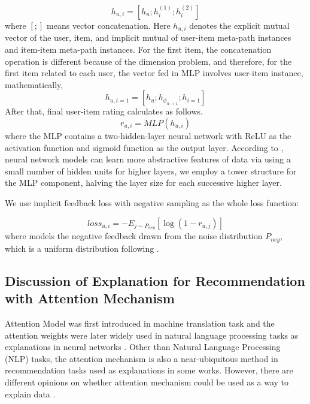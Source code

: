 \begin{equation}
	\label{eq3.5.1}
	h_{u,i}=[h_u;h_i^{(1)};h_i^{(2)}]
\end{equation}
where $[;]$ means vector concatenation. Here $h_{u,i}$ denotes the explicit mutual vector of the user, item, and implicit mutual of user-item meta-path instances and item-item meta-path instances. For the first item, the concatenation operation is different because of the dimension problem, and therefore, for the first item related to each user, the vector fed in MLP involves user-item instance, mathematically,
\begin{equation}
	h_{u,i=1} = [h_u;h_{\phi _{u\rightarrow 1}};h_{i=1}]
\end{equation}
After that, final user-item rating calculates as follows.
\begin{equation}
	\label{eq3.5.2}
	r_{u,i}=MLP(h_{u,i})
\end{equation}
where the MLP contains a two-hidden-layer neural network with ReLU as the activation function and sigmoid function as the output layer. According to \cite{hu2018leveraging, he2016deep}, neural network models can learn more abstractive features of data via using a small number of hidden units for higher layers, we employ a tower structure for the MLP component, halving the layer size for each successive higher layer. 


We use implicit feedback loss with negative sampling \cite{he2017neural, tang2015line} as the whole loss function:

\begin{equation}
	\label{eq3.5.3}
	loss_{u, i}=-E_{j \sim P_{n e g}}\left[\log \left(1-r_{u, j}\right)\right]
\end{equation}
where models the negative feedback drawn from the noise distribution $P_{n e g}$, which is a uniform distribution following \cite{hu2018leveraging}.


\subsection{Discussion of Explanation for Recommendation with Attention Mechanism}
Attention Model \cite{bahdanau2015neural, chaudhari2019attentive} was first introduced in machine translation task and the attention weights were later widely used in natural language processing tasks as explanations in neural networks \cite{xu2015show, mullenbach2018explainable}. Other than Natural Language Processing (NLP) tasks, the attention mechanism is also a near-ubiquitous method in recommendation tasks used as explanations in some works. \cite{wang2020attention, chen2018attention, tal2019neural, cong2019hierarchical}
However, there are different opinions on whether attention mechanism could be used as a way to explain data \cite{jain2019attention, wiegreffe2019attention, serrano2019attention}.

